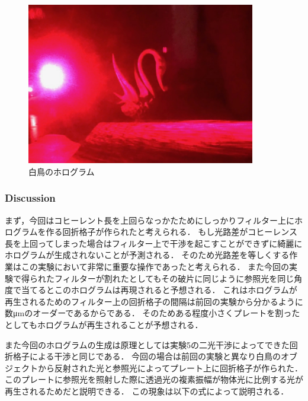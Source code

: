 \documentclass[11pt, a4paper]{jsarticle}
\begin{document}
\begin{figure}[htbp]
 \begin{center}
  \includegraphics[width=100mm]{fig24.png}
 \end{center}
 \caption{白鳥のホログラム}
 \label{fig:24}
\end{figure}
\newpage
\subsubsection{Discussion}
まず，今回はコヒーレント長を上回らなっかたためにしっかりフィルター上にホログラムを作る回折格子が作られたと考えられる．
もし光路差がコヒーレンス長を上回ってしまった場合はフィルター上で干渉を起こすことができずに綺麗にホログラムが生成されないことが予測される．
そのため光路差を等しくする作業はこの実験において非常に重要な操作であったと考えられる．
また今回の実験で得られたフィルターが割れたとしてもその破片に同じように参照光を同じ角度で当てるとこのホログラムは再現されると予想される．
これはホログラムが再生されるためのフィルター上の回折格子の間隔は前回の実験から分かるように数μmのオーダーであるからである．
そのためある程度小さくプレートを割ったとしてもホログラムが再生されることが予想される．

また今回のホログラムの生成は原理としては実験5の二光干渉によってできた回折格子による干渉と同じである．
今回の場合は前回の実験と異なり白鳥のオブジェクトから反射された光と参照光によってプレート上に回折格子が作られた．
このプレートに参照光を照射した際に透過光の複素振幅が物体光に比例する光が再生されるためだと説明できる．
この現象は以下の式によって説明される．
\end{document}
